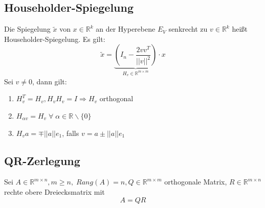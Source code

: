 \documentclass[4pt,a4paper]{scrartcl}
\begin{document}
\begin{multicols}{4}
\subsection{Householder-Spiegelung}
Die Spiegelung $\tilde{x}$ von $x\in\mathbb{R}^k$ an der Hyperebene $E_V$ senkrecht zu $v\in\mathbb{R}^k$ heißt Householder-Spiegelung. Es gilt:
\begin{equation*}
\tilde{x}=\underbrace{\left(I_n-\frac{2vv^T}{||v||^2}\right)}_{H_v\in\mathbb{R}^{m\times m}}\cdot x
\end{equation*}
Sei $v\neq 0$, dann gilt:
\begin{enumerate}[label=$\bullet$]
\item $H_v^T=H_v,H_vH_v=I\Rightarrow H_v$ orthogonal
\item $H_{\alpha v}=H_v\;\forall\;\alpha\in\mathbb{R}\backslash\{0\}$
\item $H_va=\mp ||a||e_1$, falls $v=a\pm ||a||e_1$
\end{enumerate}

\subsection{QR-Zerlegung}
Sei $A\in\mathbb{R}^{m\times n},m\geq n,\;Rang(A)=n,Q\in\mathbb{R}^{m\times m}$ orthogonale Matrix, $R\in\mathbb{R}^{m\times n}$ rechte obere Dreiecksmatrix mit
\begin{equation*}
A=QR
\end{equation*}


\end{multicols}
\end{document}
